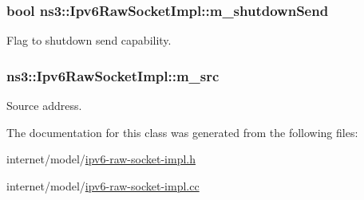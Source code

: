 \subsubsection[{\texorpdfstring{m\+\_\+shutdown\+Send}{m_shutdownSend}}]{\setlength{\rightskip}{0pt plus 5cm}bool ns3\+::\+Ipv6\+Raw\+Socket\+Impl\+::m\+\_\+shutdown\+Send\hspace{0.3cm}{\ttfamily [private]}}\hypertarget{classns3_1_1Ipv6RawSocketImpl_a974dfa7bfc98a6c070d74b42dbc1cb30}{}\label{classns3_1_1Ipv6RawSocketImpl_a974dfa7bfc98a6c070d74b42dbc1cb30}


Flag to shutdown send capability. 

\subsubsection[{\texorpdfstring{m\+\_\+src}{m_src}}]{ ns3\+::\+Ipv6\+Raw\+Socket\+Impl\+::m\+\_\+src\hspace{0.3cm}{\ttfamily [private]}}\hypertarget{classns3_1_1Ipv6RawSocketImpl_a33e8cd6e8ef2da88c6a8e954f23048d0}{}\label{classns3_1_1Ipv6RawSocketImpl_a33e8cd6e8ef2da88c6a8e954f23048d0}


Source address. 



The documentation for this class was generated from the following files\+:\begin{DoxyCompactItemize}
\item 
internet/model/\hyperlink{ipv6-raw-socket-impl_8h}{ipv6-\/raw-\/socket-\/impl.\+h}\item 
internet/model/\hyperlink{ipv6-raw-socket-impl_8cc}{ipv6-\/raw-\/socket-\/impl.\+cc}\end{DoxyCompactItemize}
